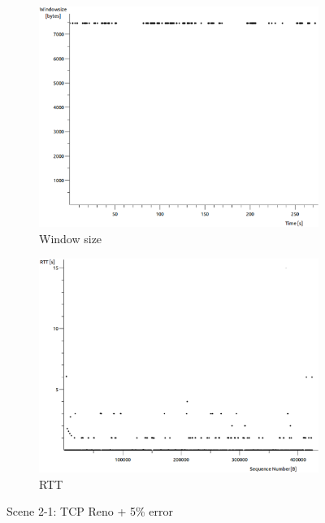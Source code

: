 \documentclass[conference,a4paper]{../../sty/IEEEtran}
\begin{document}
\begin{figure}
\begin{subfigure}[b]{0.2\textwidth}
  \includegraphics[width=\textwidth]{s2-1_wnd}
  \caption{Window size}
 \end{subfigure}
 \begin{subfigure}[b]{0.2\textwidth}
  \includegraphics[width=\textwidth]{s2-1_rtt}
  \caption{RTT}
 \end{subfigure}
 \caption{Scene 2-1: TCP Reno + 5\% error}
\end{figure}
\end{document}
